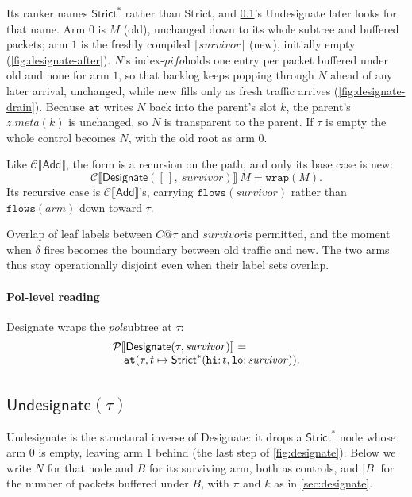 \documentclass[sigplan,anonymous,review,nonacm]{acmart}
\newcommand{\csem}[1]{\mathcal{C}\llbracket #1 \rrbracket}
\newcommand{\psem}[1]{\mathcal{P}\llbracket #1 \rrbracket}
\newcommand{\notation}[1]{\ensuremath{#1}\ifmmode\else\xspace\fi}
\newcommand{\pol}{\notation{\mathit{pol}}}
\newcommand{\pifo}{\notation{\mathit{pifo}}}
\newcommand{\survivor}{\notation{\mathit{survivor}}}
\newcommand{\Strict}{\textsf{Strict}}
\newcommand{\Strictstar}{\textsf{Strict}^{*}}
\newcommand{\Add}{\textsf{Add}}
\newcommand{\Designate}{\textsf{Designate}}
\newcommand{\Undesignate}{\textsf{Undesignate}}
\begin{document}
Its ranker names \(\Strictstar\) rather than \Strict, and \cref{sec:undesignate}'s \Undesignate{} later looks for that name.
Arm \(0\) is \(M\) (\textsf{old}), unchanged down to its whole subtree and buffered packets; arm \(1\) is the freshly compiled \(\lceil\mathit{survivor}\rceil\) (\textsf{new}), initially empty (\cref{fig:designate-after}).
\(N\)'s index-\pifo holds one entry per packet buffered under \textsf{old} and none for arm \(1\), so that backlog keeps popping through \(N\) ahead of any later arrival, unchanged, while \textsf{new} fills only as fresh traffic arrives (\cref{fig:designate-drain}).
Because \(\mathtt{at}\) writes \(N\) back into the parent's slot \(k\), the parent's \(\mathit{z}.\mathit{meta}(k)\) is unchanged, so \(N\) is transparent to the parent.
If \(\tau\) is empty the whole control becomes \(N\), with the old root as arm \(0\).

Like \(\csem{\Add}\), the form is a recursion on the path, and only its base case is new:
\[
\csem{\Designate([\,],\ \mathit{survivor})}\ M = \mathtt{wrap}(M).
\]
Its recursive case is \(\csem{\Add}\)'s, carrying \(\mathtt{flows}(\mathit{survivor})\) rather than \(\mathtt{flows}(\mathit{arm})\) down toward \(\tau\).

Overlap of leaf labels between \(C@\tau\) and \survivor is permitted, and the moment when \(\delta\) fires becomes the boundary between old traffic and new.
The two arms thus stay operationally disjoint even when their label sets overlap.

\paragraph{Pol-level reading}

\Designate{} wraps the \pol subtree at \(\tau\):
\[
\begin{array}{@{}l@{}}
\psem{\Designate(\tau, \mathit{survivor})} ={}\\
\quad \mathtt{at}(\tau, t \mapsto \Strictstar(\mathtt{hi}{:}\,t, \mathtt{lo}{:}\,\mathit{survivor})).
\end{array}
\]

\subsection{\texorpdfstring{\(\Undesignate(\tau)\)}{Undesignate}}\label{sec:undesignate}


\Undesignate{} is the structural inverse of \Designate: it drops a \(\Strictstar\) node whose arm 0 is empty, leaving arm 1 behind (the last step of \cref{fig:designate}).
Below we write \(N\) for that node and \(B\) for its surviving arm, both as controls, and \(|B|\) for the number of packets buffered under \(B\), with \(\pi\) and \(k\) as in \cref{sec:designate}.
\end{document}
